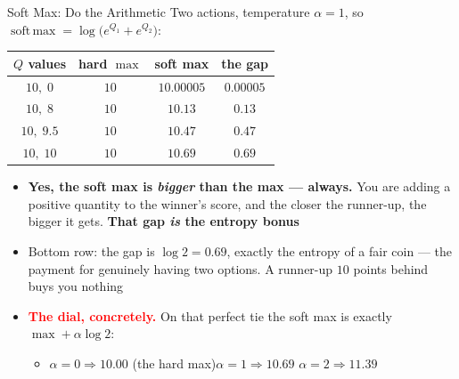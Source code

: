 \begin{frame}{Soft Max: Do the Arithmetic}
\small
Two actions, temperature $\alpha = 1$, so $\operatorname{soft\,max} = \log\big(e^{Q_1} + e^{Q_2}\big)$:
\vspace{0.4em}
\begin{center}
\renewcommand{\arraystretch}{1.35}
\small
\begin{tabular}{cccc}
\hline
$Q$ values & hard $\max$ & soft max & the gap \\
\hline
$10,\; 0$    & $10$ & $10.00005$ & $0.00005$ \\
$10,\; 8$    & $10$ & $10.13$    & $0.13$ \\
$10,\; 9.5$  & $10$ & $10.47$    & $0.47$ \\
$10,\; 10$   & $10$ & $10.69$    & $0.69$ \\
\hline
\end{tabular}
\end{center}
\vspace{0.5em}
\begin{itemize}
    \item \textbf{Yes, the soft max is \emph{bigger} than the max --- always.} You are adding a positive quantity to the winner's score, and the closer the runner-up, the bigger it gets. \textbf{That gap \emph{is} the entropy bonus}
    \vspace{0.3em}
    \item Bottom row: the gap is $\log 2 = 0.69$, exactly the entropy of a fair coin --- the payment for genuinely having two options. A runner-up $10$ points behind buys you nothing
    \vspace{0.3em}
    \item \textcolor{red}{\textbf{The dial, concretely.}} On that perfect tie the soft max is exactly $\max + \alpha\log 2$:
    \begin{itemize}
        \item $\alpha = 0 \Rightarrow 10.00$ \quad(the hard max)\qquad $\alpha = 1 \Rightarrow 10.69$ \qquad $\alpha = 2 \Rightarrow 11.39$
    \end{itemize}
\end{itemize}
\end{frame}

